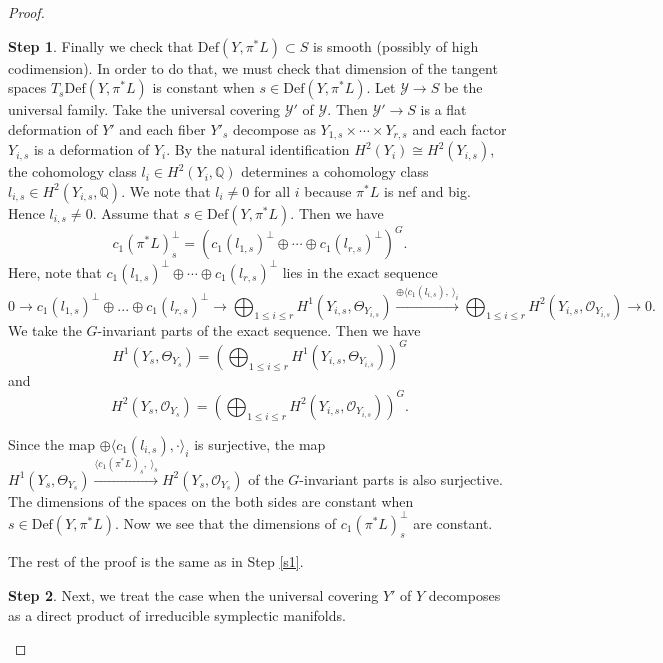 \documentclass[12pt,a4paper]{amsart}
\theoremstyle{remark}
\theoremstyle{definition}
\newtheorem{Step}{Step}
\begin{document}
\begin{proof}
\begin{Step}
Finally we check that $\mathrm{Def}(Y, \pi^*L) \subset S$ is smooth (possibly of high codimension).  In order to do that, we must check 
that dimension of the tangent spaces $T_s\mathrm{Def}(Y, \pi^*L)$ is constant when $s \in \mathrm{Def}(Y, \pi^*L)$. 
Let $\mathcal{Y} \to S$ be the universal family. Take the universal covering $\mathcal{Y}'$ of $\mathcal{Y}$. Then 
$\mathcal{Y}' \to S$ is a flat deformation of $Y'$ and each fiber $Y'_s$ decompose as $Y_{1,s} \times \cdots  \times Y_{r,s}$ and 
each factor $Y_{i,s}$ is a deformation of $Y_i$. 
By the natural identification $H^2(Y_i) \cong H^2(Y_{i,s})$, the cohomology class $l_i \in H^2(Y_i, \mathbb{Q})$ determines a cohomology class $l_{i,s} \in H^2(Y_{i,s}, \mathbb{Q})$. We note that $l_i \ne 0$ for all $i$ because $\pi^*L$ is nef and big. Hence $l_{i,s} \ne 0$. 
Assume that $s \in \mathrm{Def}(Y, \pi^*L)$. Then we have 
$$c_1(\pi^*L)_s^{\perp} = (c_1(l_{1,s})^{\perp} \oplus \cdots  \oplus c_1(l_{r,s})^{\perp})^G.$$
Here, note that $c_1(l_{1,s})^{\perp} \oplus \cdots  \oplus c_1(l_{r,s})^{\perp}$ lies in the exact sequence 
$$0 \to c_1(l_{1,s})^{\perp} \oplus ... \oplus c_1(l_{r,s})^{\perp} \to 
\bigoplus_{1 \le i \le r} H^1(Y_{i,s}, \Theta_{Y_{i,s}}) 
\stackrel{\oplus \langle c_1(l_{i,s}), \: \rangle_i}\to \bigoplus_{1 \le i \le r} H^2(Y_{i,s}, \mathcal{O}_{Y_{i,s}}) \to 0.$$ 
We take the $G$-invariant parts of the exact sequence. Then we have 
$$H^1(Y_s, \Theta_{Y_s})=
(\bigoplus_{1 \le i \le r} H^1(Y_{i,s}, \Theta_{Y_{i,s}}))^G $$ and 
$$H^2(Y_s, \mathcal{O}_{Y_s})=
(\bigoplus_{1 \le i \le r}H^2(Y_{i,s}, \mathcal{O}_{Y_{i,s}}))^G.$$ 
 
Since the map $\oplus \langle c_1(l_{i,s}), \cdot \rangle_i$ is surjective, the map 
$H^1(Y_s, \Theta_{Y_s}) \stackrel{\langle c_1(\pi^*L)_s, \: \rangle_s}\to H^2(Y_s, \mathcal{O}_{Y_s})$ of the $G$-invariant parts is also  surjective. The dimensions of the spaces on the both sides are constant when $s \in \mathrm{Def}(Y, \pi^*L)$. 
Now we see that the dimensions of 
$c_1(\pi^*L)_s^{\perp}$ are constant. 

The rest of the proof is the same as in Step \ref{s1}. %
\vspace{0.2cm}

\end{Step}
\begin{Step}\label{s3} %
Next, we treat 
 the case when the universal covering  $Y'$ of $Y$ decomposes as a direct product of irreducible symplectic manifolds. 
 \vspace{0.2cm}
 

\end{Step}
\end{proof}
\end{document}
